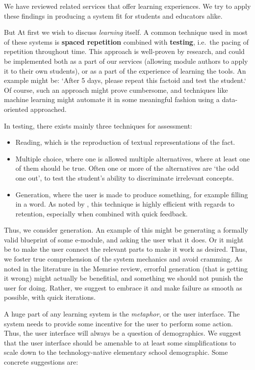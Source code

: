 We have reviewed related services that offer learning experiences. We try to 
apply these findings in producing a system fit for students and educators 
alike.

But At first we wish to discuss \textit{learning} itself. A common technique 
used in most of these systems is \textbf{spaced repetition} combined with 
\textbf{testing}, i.e.\ the pacing of repetition throughout time. This 
approach is well-proven by research, and could be implemented both as a part 
of our services (allowing module authors to apply it to their own students), 
or as a part of the experience of learning the tools. An example might be: 
`After 5 days, please repeat this factoid and test the student.` Of course, 
such an approach might prove cumbersome, and techniques like machine learning 
might automate it in some meaningful fashion using a data-oriented approached.

In testing, there exists mainly three techniques for assessment:

\begin{itemize}
\item Reading, which is the reproduction of textual representations of the fact.
\item Multiple choice, where one is allowed multiple alternatives, where at
least one of them should be true. Often one or more of the alternatives are `the
odd one out', to test the student's ability to discriminate irrelevant 
concepts.
\item Generation, where the user is made to produce something, for example
filling in a word. As noted by \cite{potts2014benefit}, this technique is 
highly efficient with regards to retention, especially when combined with 
quick feedback.
\end{itemize}

Thus, we consider generation. An example of this might be generating a formally
valid blueprint of some e-module, and asking the user what it does. Or it might
be to make the user connect the relevant parts to make it work as desired. Thus,
we foster true comprehension of the system mechanics and avoid cramming. As
noted in the literature in the Memrise review, errorful generation (that is
getting it wrong) might actually be benefitial, and something we should not
punish the user for doing. Rather, we suggest to embrace it and make failure as
smooth as possible, with quick iterations.

A huge part of any learning system is the \textit{metaphor}, or the user
interface. The system needs to provide some incentive for the user to perform
some action. Thus, the user interface will always be a question of demographics.
We suggest that the user interface should be amenable to at least some
simplifications to scale down to the technology-native elementary school
demographic. Some concrete suggestions are:

